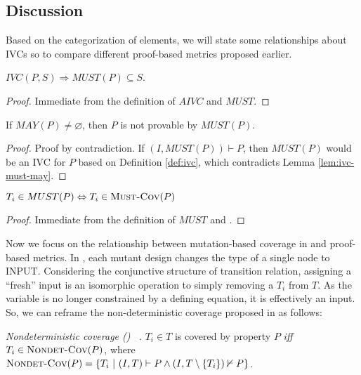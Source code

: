 \subsection{Discussion}
\label{subsec:method-disc}


Based on the categorization of elements, we will state some relationships about IVCs so to compare different proof-based metrics proposed earlier.

\begin{lemma}
  \label{lem:ivc-must-may}
 $IVC(P, S) \Rightarrow  MUST(P) \subseteq S$.
\end{lemma}
\begin{proof}
 Immediate from the definition of $AIVC$ and $MUST$.
\end{proof}
\vspace{2mm}

\begin{lemma}
  \label{lem:must-not-enough}
  If $MAY(P) \neq \varnothing$, then $P$ is not provable by $MUST(P)$.
\end{lemma}
\begin{proof}
  Proof by contradiction. If $(I, MUST(P)) \vdash P$, then $MUST(P)$
  would be an IVC for $P$ based on Definition \ref{def:ivc},
  which contradicts Lemma \ref{lem:ivc-must-may}.
\end{proof}
\vspace{2mm}

\begin{lemma}
    \label{lem:must-mustcov}
    $T_i \in MUST(P) \Leftrightarrow T_i \in \text{\sc Must-Cov}(P)$
\end{lemma}
\begin{proof}
Immediate from the definition of $MUST$ and \mustcov. 
\end{proof}

Now we focus on the relationship between mutation-based coverage in \cite{chockler2010coverage} and proof-based metrics. In \cite{chockler2010coverage}, each mutant design changes the type of a single node to INPUT. Considering the conjunctive structure of transition relation, assigning a ``fresh'' input is an isomorphic operation to simply removing a $T_i$ from $T$.
As the variable is no longer constrained by a defining equation, it is effectively an input. 
So, we can reframe the non-deterministic coverage proposed in \cite{chockler2010coverage} as follows:

\begin{definition} {\emph{Nondeterministic coverage (\nondetcov) ~\cite{chockler2010coverage}.} }
\label{def:non-det-2}
$T_i \in T$ is covered by property $P$ \emph{iff} $T_i \in \text{\sc Nondet-Cov} (P)$, where
$\text{\sc Nondet-Cov} (P) = \{T_i~|~ (I, T) \vdash P \wedge (I, T \setminus \{T_i\}) \nvdash P\}$.
\end{definition}


